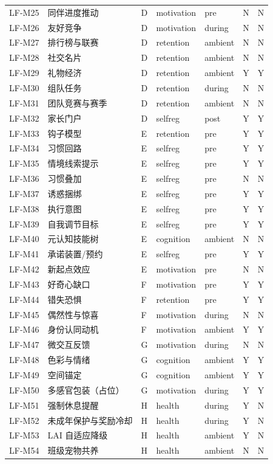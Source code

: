 \begin{table}[htbp]
\begin{tabular}{lllllcc}
LF-M25 & 同伴进度推动 & D & motivation & pre & N & N \\
LF-M26 & 友好竞争 & D & motivation & during & N & N \\
LF-M27 & 排行榜与联赛 & D & retention & ambient & N & N \\
LF-M28 & 社交名片 & D & retention & ambient & N & N \\
LF-M29 & 礼物经济 & D & retention & ambient & Y & Y \\
LF-M30 & 组队任务 & D & retention & during & N & N \\
LF-M31 & 团队竞赛与赛季 & D & retention & ambient & N & N \\
LF-M32 & 家长门户 & D & selfreg & post & Y & Y \\
LF-M33 & 钩子模型 & E & retention & pre & Y & Y \\
LF-M34 & 习惯回路 & E & selfreg & pre & Y & Y \\
LF-M35 & 情境线索提示 & E & selfreg & pre & Y & Y \\
LF-M36 & 习惯叠加 & E & selfreg & pre & N & N \\
LF-M37 & 诱惑捆绑 & E & selfreg & pre & Y & Y \\
LF-M38 & 执行意图 & E & selfreg & pre & Y & Y \\
LF-M39 & 自我调节目标 & E & selfreg & pre & Y & Y \\
LF-M40 & 元认知技能树 & E & cognition & ambient & N & N \\
LF-M41 & 承诺装置/预约 & E & selfreg & pre & Y & Y \\
LF-M42 & 新起点效应 & E & motivation & pre & N & N \\
LF-M43 & 好奇心缺口 & F & motivation & pre & Y & Y \\
LF-M44 & 错失恐惧 & F & retention & pre & Y & Y \\
LF-M45 & 偶然性与惊喜 & F & motivation & during & N & N \\
LF-M46 & 身份认同动机 & F & motivation & ambient & Y & Y \\
LF-M47 & 微交互反馈 & G & motivation & during & N & N \\
LF-M48 & 色彩与情绪 & G & cognition & ambient & Y & Y \\
LF-M49 & 空间锚定 & G & cognition & ambient & Y & Y \\
LF-M50 & 多感官包装（占位） & G & motivation & during & Y & Y \\
LF-M51 & 强制休息提醒 & H & health & during & Y & N \\
LF-M52 & 未成年保护与奖励冷却 & H & health & during & Y & N \\
LF-M53 & LAI 自适应降级 & H & health & ambient & Y & N \\
LF-M54 & 班级宠物共养 & H & health & ambient & N & N \\
\bottomrule
\end{tabular}
\end{table}